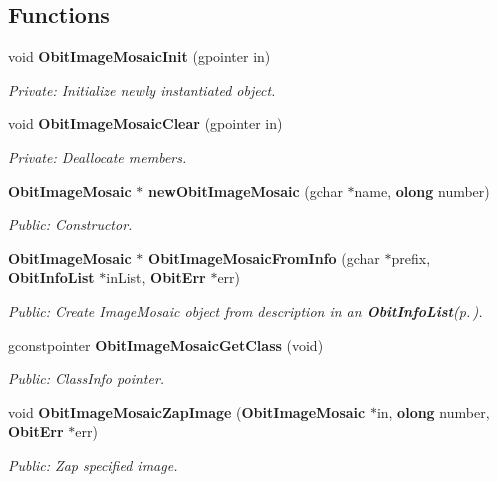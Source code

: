 \subsection*{Functions}
\begin{CompactItemize}
\item 
void {\bf Obit\-Image\-Mosaic\-Init} (gpointer in)
\begin{CompactList}\small\item\em Private: Initialize newly instantiated object. \item\end{CompactList}\item 
void {\bf Obit\-Image\-Mosaic\-Clear} (gpointer in)
\begin{CompactList}\small\item\em Private: Deallocate members. \item\end{CompactList}\item 
{\bf Obit\-Image\-Mosaic} $\ast$ {\bf new\-Obit\-Image\-Mosaic} (gchar $\ast$name, {\bf olong} number)
\begin{CompactList}\small\item\em Public: Constructor. \item\end{CompactList}\item 
{\bf Obit\-Image\-Mosaic} $\ast$ {\bf Obit\-Image\-Mosaic\-From\-Info} (gchar $\ast$prefix, {\bf Obit\-Info\-List} $\ast$in\-List, {\bf Obit\-Err} $\ast$err)
\begin{CompactList}\small\item\em Public: Create Image\-Mosaic object from description in an {\bf Obit\-Info\-List}{\rm (p.\,\pageref{structObitInfoList})}. \item\end{CompactList}\item 
gconstpointer {\bf Obit\-Image\-Mosaic\-Get\-Class} (void)
\begin{CompactList}\small\item\em Public: Class\-Info pointer. \item\end{CompactList}\item 
void {\bf Obit\-Image\-Mosaic\-Zap\-Image} ({\bf Obit\-Image\-Mosaic} $\ast$in, {\bf olong} number, {\bf Obit\-Err} $\ast$err)
\begin{CompactList}\small\item\em Public: Zap specified image. \item\end{CompactList}\item 

\end{CompactItemize}
